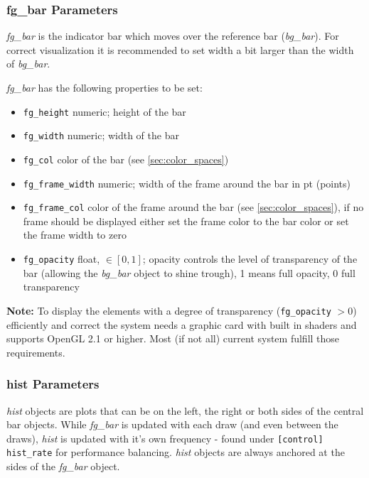 \documentclass[12pt,a4paper]{book}
\begin{document}

\subsubsection{fg\_bar Parameters}

\textit{fg\_bar} is the indicator bar which moves over the reference bar (\textit{bg\_bar}). For correct visualization it is recommended to set width a bit larger than the width of \textit{bg\_bar}.

\textit{fg\_bar} has the following properties to be set:
\begin{itemize}
\item \verb|fg_height| numeric; height of the bar
\item \verb|fg_width| numeric; width of the bar
\item \verb|fg_col| color of the bar (see \ref{sec:color_spaces})
\item \verb|fg_frame_width| numeric; width of the frame around the bar in pt (points)
\item \verb|fg_frame_col| color of the frame around the bar  (see \ref{sec:color_spaces}), if no frame should be displayed either set the frame color to the bar color or set the frame width to zero
\item \verb|fg_opacity| float, $\in [0, 1]$; opacity controls the level of transparency of the bar (allowing the \textit{bg\_bar} object to shine trough), 1 means full opacity, 0 full transparency
\end{itemize}


\textbf{Note:} To display the elements with a degree of transparency (\verb|fg_opacity| $ > 0$) efficiently and correct the system needs a graphic card with built in shaders and supports OpenGL 2.1 or higher. Most (if not all) current system fulfill those requirements.

\subsubsection{hist Parameters}

\textit{hist} objects are plots that can be on the left, the right or both sides of the central bar objects. While \textit{fg\_bar} is updated with each draw (and even between the draws), \textit{hist} is updated with it's own frequency - found under \verb|[control] hist_rate| for performance balancing. \textit{hist} objects are always anchored at the sides of the \textit{fg\_bar} object.
\end{document}
